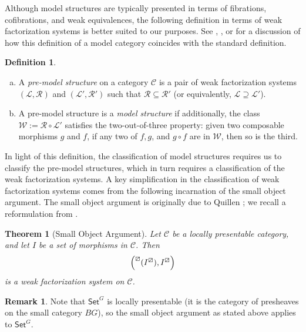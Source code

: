 \documentclass{amsart}
\newcommand{\Set}{\mathsf{Set}}
\newcommand{\GSet}{\Set^G}
\newcommand{\cat}{\mathcal}
\newcommand{\catC}{\mathcal{C}}
\newcommand{\llp}[1]{\prescript{\boxslash}{}{#1}}
\newcommand{\rlp}[1]{{#1}^{\boxslash}}
\numberwithin{equation}{section}
\newtheorem{theorem}[equation]{Theorem}
\theoremstyle{definition}
\newtheorem{definition}[equation]{Definition}
\newtheorem{remark}[equation]{Remark}
\begin{document}
Although model structures are typically presented in terms of fibrations, cofibrations, and weak equivalences, the following definition in terms of weak factorization systems is better suited to our purposes. See \cite[Definition 7.7]{jt2007}, \cite[Definition 4.1]{ACB2025}, or \cite[Section 2]{BBO2024} for a discussion of how this definition of a model category coincides with the standard definition.

\begin{definition}\
	\begin{enumerate}[(a)]
		\item A \emph{pre-model structure} on a category $\catC$ is a pair of weak factorization systems $(\cat L, \cat R)$ and $(\cat L', \cat R')$ such that $\cat R \subseteq \cat R'$ (or equivalently, $\cat L \supseteq \cat L'$).
		\item A pre-model structure is a \emph{model structure} if additionally, the class $\cat{W} := \cat R \circ \cat L'$ satisfies the two-out-of-three property: given two composable morphisms $g$ and $f$, if any two of $f, g$, and $g \circ f$ are in $\mathcal{W}$, then so is the third.
	\end{enumerate}
\end{definition}

In light of this definition, the classification of model structures requires us to classify the pre-model structures, which in turn requires a classification of the weak factorization systems. A key simplification in the classification of weak factorization systems comes from the following incarnation of the small object argument. The small object argument is originally due to Quillen \cite[Lemma 2.3.4]{Quillen1967}; we recall a reformulation from \cite[Theorem 12.2.2 and Corollary 12.2.4]{Riehl2014}.


\begin{theorem}[Small Object Argument]
	\label{smallobjectargument}
	Let $\catC$ be a locally presentable category, and let $I$ be a \emph{set} of morphisms in $\catC$. Then
	\[
		\left(\llp{(\rlp{I})},\rlp{I}\right)
	\]
	is a weak factorization system on $\catC$.
\end{theorem}

\begin{remark}
	Note that $\GSet$ is locally presentable (it is the category of presheaves on the small category $BG$), so the small object argument as stated above applies to $\GSet$.
\end{remark}
\end{document}
